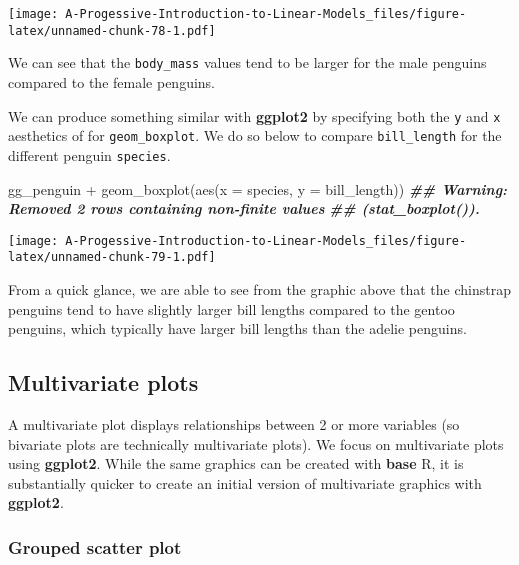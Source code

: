 \documentclass[
]{book}
\newenvironment{Shaded}{\begin{snugshade}}{\end{snugshade}}
\newcommand{\AttributeTok}[1]{\textcolor[rgb]{0.77,0.63,0.00}{#1}}
\newcommand{\DocumentationTok}[1]{\textcolor[rgb]{0.56,0.35,0.01}{\textbf{\textit{#1}}}}
\newcommand{\FunctionTok}[1]{\textcolor[rgb]{0.00,0.00,0.00}{#1}}
\newcommand{\NormalTok}[1]{#1}
\newcommand{\SpecialCharTok}[1]{\textcolor[rgb]{0.00,0.00,0.00}{#1}}
\theoremstyle{definition}
\theoremstyle{definition}
\theoremstyle{definition}
\theoremstyle{definition}
\theoremstyle{remark}
\begin{document}
\texttt{[image: A-Progessive-Introduction-to-Linear-Models\_files/figure-latex/unnamed-chunk-78-1.pdf]}

We can see that the \texttt{body\_mass} values tend to be larger for the male penguins compared to the female penguins.

We can produce something similar with \textbf{ggplot2} by specifying both the \texttt{y} and \texttt{x} aesthetics of for \texttt{geom\_boxplot}. We do so below to compare \texttt{bill\_length} for the different penguin \texttt{species}.

\begin{Shaded}
\begin{Highlighting}[]
\NormalTok{gg\_penguin }\SpecialCharTok{+} \FunctionTok{geom\_boxplot}\NormalTok{(}\FunctionTok{aes}\NormalTok{(}\AttributeTok{x =}\NormalTok{ species, }\AttributeTok{y =}\NormalTok{ bill\_length))}
\DocumentationTok{\#\# Warning: Removed 2 rows containing non{-}finite values}
\DocumentationTok{\#\# (\textasciigrave{}stat\_boxplot()\textasciigrave{}).}
\end{Highlighting}
\end{Shaded}

\texttt{[image: A-Progessive-Introduction-to-Linear-Models\_files/figure-latex/unnamed-chunk-79-1.pdf]}

From a quick glance, we are able to see from the graphic above that the chinstrap penguins tend to have slightly larger bill lengths compared to the gentoo penguins, which typically have larger bill lengths than the adelie penguins.

\hypertarget{multivariate-plots}{%
\subsection{Multivariate plots}\label{multivariate-plots}}

A multivariate plot displays relationships between 2 or more variables (so bivariate plots are technically multivariate plots). We focus on multivariate plots using \textbf{ggplot2}. While the same graphics can be created with \textbf{base} R, it is substantially quicker to create an initial version of multivariate graphics with \textbf{ggplot2}.

\hypertarget{grouped-scatter-plot}{%
\subsubsection{Grouped scatter plot}\label{grouped-scatter-plot}}
\end{document}
